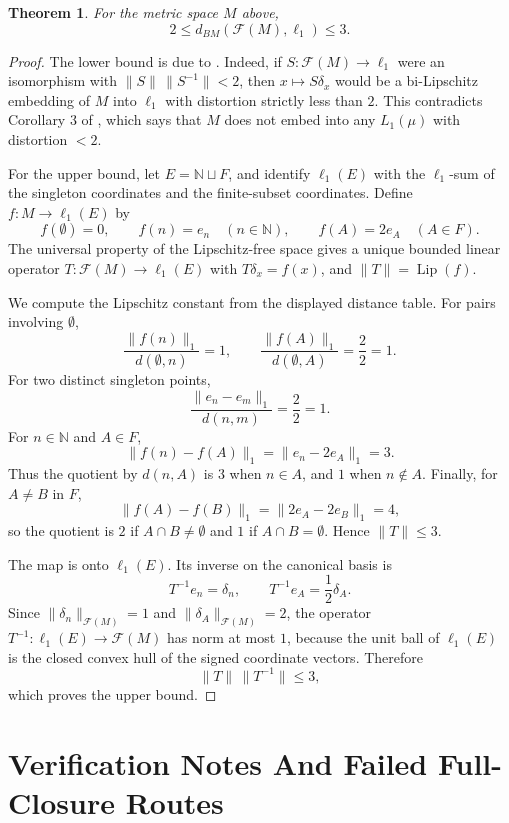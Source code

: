 \documentclass[11pt]{article}
\newtheorem{theorem}{Theorem}
\newcommand{\F}{\mathcal F}
\newcommand{\N}{\mathbb N}
\begin{document}
\begin{theorem}
For the metric space \(M\) above,
\[
2\le d_{BM}(\F(M),\ell_1)\le 3.
\]
\end{theorem}

\begin{proof}
The lower bound is due to \cite{PSG}.  Indeed, if
\(S:\F(M)\to \ell_1\) were an isomorphism with
\(\|S\|\,\|S^{-1}\|<2\), then \(x\mapsto S\delta_x\) would be a
bi-Lipschitz embedding of \(M\) into \(\ell_1\) with distortion
strictly less than \(2\).  This contradicts Corollary 3 of \cite{PSG},
which says that \(M\) does not embed into any \(L_1(\mu)\) with
distortion \(<2\).

For the upper bound, let \(E=\N\sqcup F\), and identify
\(\ell_1(E)\) with the \(\ell_1\)-sum of the singleton coordinates and
the finite-subset coordinates.  Define \(f:M\to \ell_1(E)\) by
\[
f(\emptyset)=0,\qquad f(n)=e_n\quad(n\in\N),\qquad f(A)=2e_A\quad(A\in F).
\]
The universal property of the Lipschitz-free space gives a unique
bounded linear operator \(T:\F(M)\to \ell_1(E)\) with
\(T\delta_x=f(x)\), and \(\|T\|=\operatorname{Lip}(f)\).

We compute the Lipschitz constant from the displayed distance table.
For pairs involving \(\emptyset\),
\[
\frac{\|f(n)\|_1}{d(\emptyset,n)}=1,\qquad
\frac{\|f(A)\|_1}{d(\emptyset,A)}=\frac{2}{2}=1.
\]
For two distinct singleton points,
\[
\frac{\|e_n-e_m\|_1}{d(n,m)}=\frac{2}{2}=1.
\]
For \(n\in\N\) and \(A\in F\),
\[
\|f(n)-f(A)\|_1=\|e_n-2e_A\|_1=3.
\]
Thus the quotient by \(d(n,A)\) is \(3\) when \(n\in A\), and \(1\)
when \(n\notin A\).  Finally, for \(A\ne B\) in \(F\),
\[
\|f(A)-f(B)\|_1=\|2e_A-2e_B\|_1=4,
\]
so the quotient is \(2\) if \(A\cap B\ne\emptyset\) and \(1\) if
\(A\cap B=\emptyset\).  Hence \(\|T\|\le 3\).

The map is onto \(\ell_1(E)\).  Its inverse on the canonical basis is
\[
T^{-1}e_n=\delta_n,\qquad T^{-1}e_A=\frac12\delta_A.
\]
Since \(\|\delta_n\|_{\F(M)}=1\) and \(\|\delta_A\|_{\F(M)}=2\), the
operator \(T^{-1}:\ell_1(E)\to \F(M)\) has norm at most \(1\), because
the unit ball of \(\ell_1(E)\) is the closed convex hull of the signed
coordinate vectors.  Therefore
\[
\|T\|\,\|T^{-1}\|\le 3,
\]
which proves the upper bound.
\end{proof}

\section*{Verification Notes And Failed Full-Closure Routes}
\end{document}
